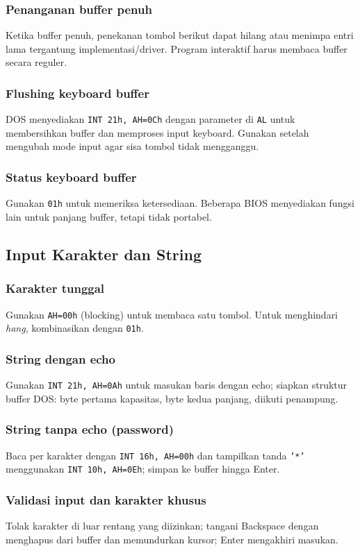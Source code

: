 \documentclass[../main.tex]{subfiles}
\begin{document}
\subsubsection{Penanganan buffer penuh}
Ketika buffer penuh, penekanan tombol berikut dapat hilang atau menimpa entri lama tergantung implementasi/driver. Program interaktif harus membaca buffer secara reguler.

\subsubsection{Flushing keyboard buffer}
DOS menyediakan \texttt{INT 21h, AH=0Ch} dengan parameter di \texttt{AL} untuk membersihkan buffer dan memproses input keyboard. Gunakan setelah mengubah mode input agar sisa tombol tidak mengganggu.

\subsubsection{Status keyboard buffer}
Gunakan \texttt{01h} untuk memeriksa ketersediaan. Beberapa BIOS menyediakan fungsi lain untuk panjang buffer, tetapi tidak portabel.

\subsection{Input Karakter dan String}
\subsubsection{Karakter tunggal}
Gunakan \texttt{AH=00h} (blocking) untuk membaca satu tombol. Untuk menghindari \textit{hang}, kombinasikan dengan \texttt{01h}.

\subsubsection{String dengan echo}
Gunakan \texttt{INT 21h, AH=0Ah} untuk masukan baris dengan echo; siapkan struktur buffer DOS: byte pertama kapasitas, byte kedua panjang, diikuti penampung.

\subsubsection{String tanpa echo (password)}
Baca per karakter dengan \texttt{INT 16h, AH=00h} dan tampilkan tanda \texttt{'*'} menggunakan \texttt{INT 10h, AH=0Eh}; simpan ke buffer hingga Enter.

\subsubsection{Validasi input dan karakter khusus}
Tolak karakter di luar rentang yang diizinkan; tangani Backspace dengan menghapus dari buffer dan memundurkan kursor; Enter mengakhiri masukan.
\end{document}
